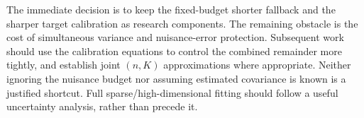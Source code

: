 \documentclass[11pt]{article}
\begin{document}
The immediate decision is to keep the fixed-budget shorter fallback and
the sharper target calibration as research components. The remaining obstacle
is the cost of simultaneous variance and nuisance-error protection. Subsequent
work should use the calibration equations to control the combined remainder
more tightly, and establish joint $(n,K)$ approximations where appropriate.
Neither ignoring the nuisance budget nor assuming estimated covariance is
known is a justified shortcut. Full sparse/high-dimensional fitting should
follow a useful uncertainty analysis, rather than precede it.



\end{document}
